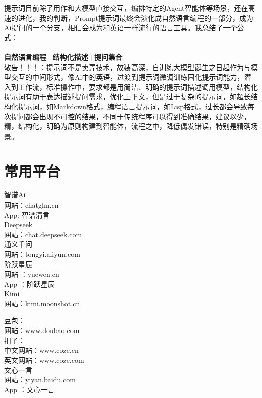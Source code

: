 \documentclass[12pt]{book}
\begin{document}
	提示词目前除了用作和大模型直接交互，编排特定的Agent智能体等场景，还在高速的进化，我的判断，Prompt提示词最终会演化成自然语言编程的一部分，成为Ai提问的一个分支，相信会成为和英语一样流行的语言工具。我总结了一个公式：\\\\
	\textbf{自然语言编程=结构化描述+提问集合}\\
	
	
	敬告！！！：提示词不是卖弄技术，故装高深，自训练大模型诞生之日起作为与模型交互的中间形式，像Ai中的英语，过渡到提示词微调训练固化提示词能力，潜入到工作流，标准操作中，要求都是用简洁、明确的提示词描述调用模型，结构化提示词有助于表达描述提问需求，优化上下文，但是过于复杂的提示词，如超长结构化提示词，如Markdown格式，编程语言提示词，如Lisp格式，过长都会导致每次提问都会出现不可控的结果，不同于传统程序可以得到准确结果，建议以少，精，结构化，明确为原则构建到智能体，流程之中，降低偶发错误，特别是精确场景。
	
	\section{常用平台}
	智谱Ai\\
	网站：chatglm.cn \\
	App: 智谱清言\\
	
	Deepseek\\
	网站：chat.deepseek.com\\
	
	
	通义千问\\
	网站：tongyi.aliyun.com\\
	
	阶跃星辰\\
	网站 ：yuewen.cn\\
	App ：阶跃星辰 \\
	
	
	Kimi \\
	网站：kimi.moonshot.cn

	豆包：\\
	网站：www.doubao.com\\
	
	扣子：\\
	中文网站：www.coze.cn\\
	英文网站：www.coze.com\\
	
	文心一言\\
	网站：yiyan.baidu.com\\
	App ：文心一言 \\
	
\end{document}
